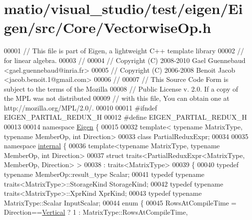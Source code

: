 \hypertarget{matio_2visual__studio_2test_2eigen_2_eigen_2src_2_core_2_vectorwise_op_8h_source}{}\section{matio/visual\+\_\+studio/test/eigen/\+Eigen/src/\+Core/\+Vectorwise\+Op.h}
\label{matio_2visual__studio_2test_2eigen_2_eigen_2src_2_core_2_vectorwise_op_8h_source}

\begin{DoxyCode}
00001 \textcolor{comment}{// This file is part of Eigen, a lightweight C++ template library}
00002 \textcolor{comment}{// for linear algebra.}
00003 \textcolor{comment}{//}
00004 \textcolor{comment}{// Copyright (C) 2008-2010 Gael Guennebaud <gael.guennebaud@inria.fr>}
00005 \textcolor{comment}{// Copyright (C) 2006-2008 Benoit Jacob <jacob.benoit.1@gmail.com>}
00006 \textcolor{comment}{//}
00007 \textcolor{comment}{// This Source Code Form is subject to the terms of the Mozilla}
00008 \textcolor{comment}{// Public License v. 2.0. If a copy of the MPL was not distributed}
00009 \textcolor{comment}{// with this file, You can obtain one at http://mozilla.org/MPL/2.0/.}
00010 
00011 \textcolor{preprocessor}{#ifndef EIGEN\_PARTIAL\_REDUX\_H}
00012 \textcolor{preprocessor}{#define EIGEN\_PARTIAL\_REDUX\_H}
00013 
00014 \textcolor{keyword}{namespace }\hyperlink{namespace_eigen}{Eigen} \{
00015 
00032 \textcolor{keyword}{template}< \textcolor{keyword}{typename} MatrixType, \textcolor{keyword}{typename} MemberOp, \textcolor{keywordtype}{int} Direction>
00033 \textcolor{keyword}{class }PartialReduxExpr;
00034 
00035 \textcolor{keyword}{namespace }\hyperlink{namespaceinternal}{internal} \{
00036 \textcolor{keyword}{template}<\textcolor{keyword}{typename} MatrixType, \textcolor{keyword}{typename} MemberOp, \textcolor{keywordtype}{int} Direction>
00037 \textcolor{keyword}{struct }traits<PartialReduxExpr<MatrixType, MemberOp, Direction> >
00038  : traits<MatrixType>
00039 \{
00040   \textcolor{keyword}{typedef} \textcolor{keyword}{typename} MemberOp::result\_type Scalar;
00041   \textcolor{keyword}{typedef} \textcolor{keyword}{typename} traits<MatrixType>::StorageKind StorageKind;
00042   \textcolor{keyword}{typedef} \textcolor{keyword}{typename} traits<MatrixType>::XprKind XprKind;
00043   \textcolor{keyword}{typedef} \textcolor{keyword}{typename} MatrixType::Scalar InputScalar;
00044   \textcolor{keyword}{enum} \{
00045     RowsAtCompileTime = Direction==\hyperlink{group__enums_ggad49a7b3738e273eb00932271b36127f7addca718e0564723df21d61b94b1198be}{Vertical}   ? 1 : MatrixType::RowsAtCompileTime,

\end{DoxyCode}
